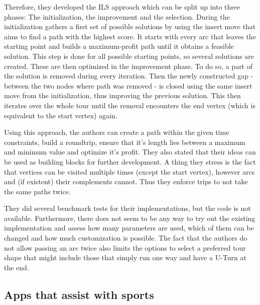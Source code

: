 Therefore, they developed the ILS approach which can be split up into three phases:
The initialization, the improvement and the selection.
During the initialization gathers a first set of possible solutions by using the insert move that aims to find a path with the highest score.
It starts with every arc that leaves the starting point and builds a maximum-profit path until it obtains a feasible solution.
This step is done for all possible starting points, so several solutions are created.
These are then optimized in the improvement phase. 
To do so, a part of the solution is removed during every iteration.
Then the newly constructed gap - between the two nodes where path was removed - is closed using the same insert move from the initialization, thus improving the previous solution.
This then iterates over the whole tour until the removal encounters the end vertex (which is equivalent to the start vertex) again. \cite{verbeeck_extension_2014}

Using this approach, the authors can create a path within the given time constraints, build a roundtrip, ensure that it's length lies between a maximum and minimum value and optimize it's profit.
They also stated that their ideas can be used as \glqq building blocks\grqq{} for further development.
A thing they stress is the fact that vertices can be visited multiple times (except the start vertex), however arcs and (if existent) their complements cannot. 
Thus they enforce trips to not take the same paths twice. \cite{verbeeck_extension_2014}

They did several benchmark tests for their implementations, but the code is not available.
Furthermore, there does not seem to be any way to try out the existing implementation and assess how many parameters are used, which of them can be changed and how much customization is possible.
The fact that the authors do not allow passing an arc twice also limits the options to select a preferred tour shape that might include those that simply run one way and have a U-Turn at the end. 



\subsection{Apps that assist with sports}
\label{subsec:runningApps}

